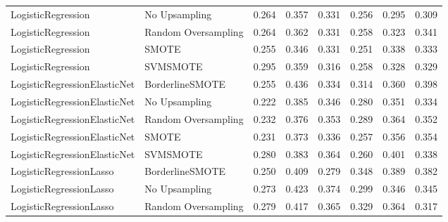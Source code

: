 \begin{tabular}{llllllll}
          LogisticRegression &       No Upsampling & 0.264 &                     0.357 &                 0.331 &                  0.256 &                                   0.295 &     0.309 \\
          LogisticRegression & Random Oversampling & 0.264 &                     0.362 &                 0.331 &                  0.258 &                                   0.323 &     0.341 \\
          LogisticRegression &               SMOTE & 0.255 &                     0.346 &                 0.331 &                  0.251 &                                   0.338 &     0.333 \\
          LogisticRegression &            SVMSMOTE & 0.295 &                     0.359 &                 0.316 &                  0.258 &                                   0.328 &     0.329 \\
LogisticRegressionElasticNet &     BorderlineSMOTE & 0.255 &                     0.436 &                 0.334 &                  0.314 &                                   0.360 &     0.398 \\
LogisticRegressionElasticNet &       No Upsampling & 0.222 &                     0.385 &                 0.346 &                  0.280 &                                   0.351 &     0.334 \\
LogisticRegressionElasticNet & Random Oversampling & 0.232 &                     0.376 &                 0.353 &                  0.289 &                                   0.364 &     0.352 \\
LogisticRegressionElasticNet &               SMOTE & 0.231 &                     0.373 &                 0.336 &                  0.257 &                                   0.356 &     0.354 \\
LogisticRegressionElasticNet &            SVMSMOTE & 0.280 &                     0.383 &                 0.364 &                  0.260 &                                   0.401 &     0.338 \\
     LogisticRegressionLasso &     BorderlineSMOTE & 0.250 &                     0.409 &                 0.279 &                  0.348 &                                   0.389 &     0.382 \\
     LogisticRegressionLasso &       No Upsampling & 0.273 &                     0.423 &                 0.374 &                  0.299 &                                   0.346 &     0.345 \\
     LogisticRegressionLasso & Random Oversampling & 0.279 &                     0.417 &                 0.365 &                  0.329 &                                   0.364 &     0.317 \\

\end{tabular}
